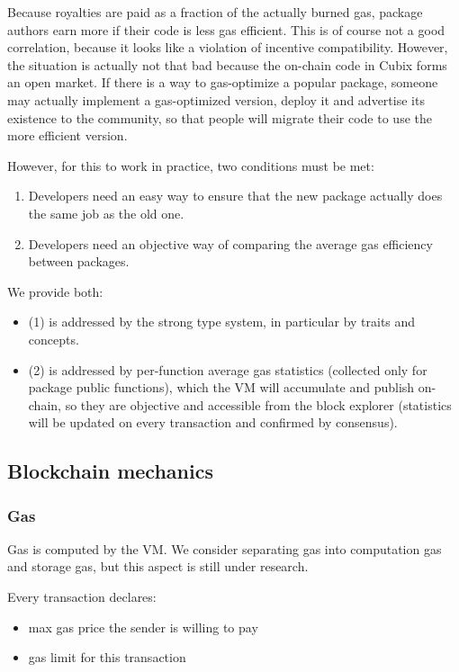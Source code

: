 \documentclass[a4paper]{article}
\begin{document}
Because royalties are paid as a fraction of the actually burned gas, package authors earn more if their code is less gas efficient. This is of course not a good correlation, because it looks like a violation of incentive compatibility. However, the situation is actually not that bad because the on-chain code in Cubix forms an open market. If there is a way to gas-optimize a popular package, someone may actually implement a gas-optimized version, deploy it and advertise its existence to the community, so that people will migrate their code to use the more efficient version.

However, for this to work in practice, two conditions must be met:

\begin{enumerate}
  \item Developers need an easy way to ensure that the new package actually does the same job as the old one.
  \item Developers need an objective way of comparing the average gas efficiency between packages.
\end{enumerate}

We provide both:

\begin{itemize}
  \item (1) is addressed by the strong type system, in particular by traits and concepts.
  \item (2) is addressed by per-function average gas statistics (collected only for package public functions), which the VM will accumulate and publish on-chain, so they are objective and accessible from the block explorer (statistics will be updated on every transaction and confirmed by consensus).
\end{itemize}

\subsection{Blockchain mechanics}

\subsubsection{Gas}

Gas is computed by the VM. We consider separating gas into computation gas and storage gas, but this aspect is still under research.

Every transaction declares:

\begin{itemize}
  \item max gas price the sender is willing to pay
  \item gas limit for this transaction
\end{itemize}
\end{document}
